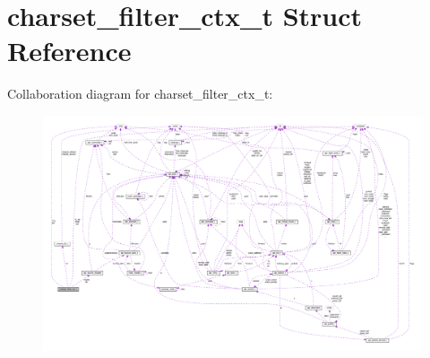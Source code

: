 \hypertarget{structcharset__filter__ctx__t}{}\section{charset\+\_\+filter\+\_\+ctx\+\_\+t Struct Reference}
\label{structcharset__filter__ctx__t}


Collaboration diagram for charset\+\_\+filter\+\_\+ctx\+\_\+t\+:
\nopagebreak
\begin{figure}[H]
\begin{center}
\leavevmode
\includegraphics[width=350pt]{structcharset__filter__ctx__t__coll__graph}
\end{center}
\end{figure}
